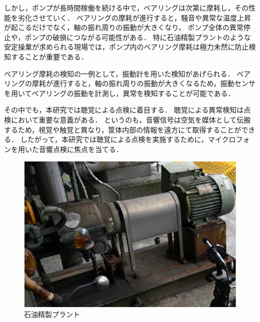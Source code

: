\documentclass[../main]{subfiles}
\begin{document}
しかし，ポンプが長時間稼働を続ける中で，ベアリングは次第に摩耗し，その性能を劣化させていく．
ベアリングの摩耗が進行すると，騒音や異常な温度上昇が起こるだけでなく，軸の振れ周りの振動が大きくなり，
ポンプ全体の異常停止や，ポンプの破損につながる可能性がある．
特に石油精製プラントのような安定操業が求められる現場では，ポンプ内のベアリング摩耗は極力未然に防止検知することが重要である．

ベアリング摩耗の検知の一例として，振動計を用いた検知があげられる．\cite{SMITH2015100}
ベアリングの摩耗が進行すると，軸の振れ周りの振動が大きくなるため，振動センサを用いてベアリングの振動を計測し，異常を検知することが可能である．

その中でも，本研究では聴覚による点検に着目する．
聴覚による異常検知は点検において重要な意義がある．
というのも，音響信号は空気を媒体として伝搬するため，視覚や触覚と異なり，筐体内部の情報を遠方にて取得することができる．
したがって，本研究では聴覚による点検を実施するために，マイクロフォンを用いた音響点検に焦点を当てる．

\begin{figure}[t]
  \centering
  \includegraphics[keepaspectratio, width=1.0\linewidth]{chap1/pump.pdf}
  \caption{石油精製プラント}
  \label{fig:pump}
\end{figure}
\end{document}
